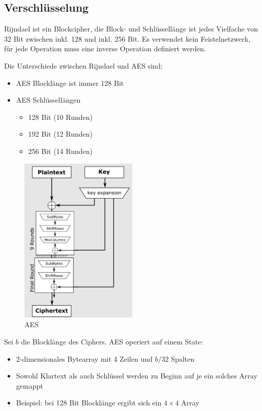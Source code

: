 \subsection{Verschlüsselung}

Rijndael ist ein Blockcipher, die Block- und Schlüssellänge ist jedes Vielfache von 32 Bit zwischen inkl. 128 und inkl. 256 Bit.
Es verwendet kein Feistelnetzwerk, für jede Operation muss eine inverse Operation definiert werden.

Die Unterschiede zwischen Rijndael und AES sind:
\begin{itemize}
    \item AES Blocklänge ist immer 128 Bit
    \item AES Schlüssellängen
    \begin{itemize}
        \item 128 Bit (10 Runden)
        \item 192 Bit (12 Runden)
        \item 256 Bit (14 Runden)
    \end{itemize}
\end{itemize}

\begin{figure}[h]
    \includegraphics[width=0.5\textwidth]{figures/fig06-aes}
    \centering
    \caption{AES}
\end{figure}

Sei $b$ die Blocklänge des Ciphers. AES operiert auf einem State:
\begin{itemize}
    \item 2-dimensionales Bytearray mit 4 Zeilen und $b/32$ Spalten
    \item Sowohl Klartext als auch Schlüssel werden zu Beginn auf je ein solches Array gemappt
    \item Beispiel: bei 128 Bit Blocklänge ergibt sich ein $4 \times 4$ Array
\end{itemize}

